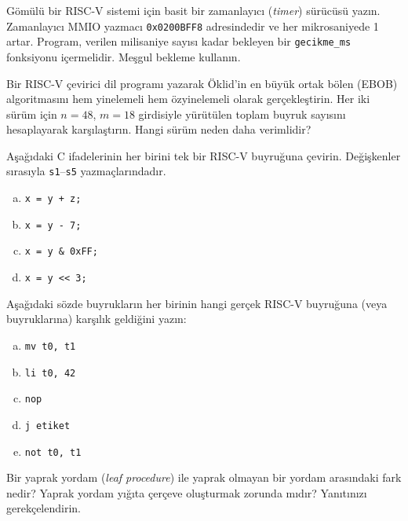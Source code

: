 \begin{alistirma}[\zor]
Gömülü bir RISC-V sistemi için basit bir zamanlayıcı (\emph{timer}) sürücüsü yazın. Zamanlayıcı MMIO yazmacı \texttt{0x0200BFF8} adresindedir ve her mikrosaniyede 1 artar. Program, verilen milisaniye sayısı kadar bekleyen bir \texttt{gecikme\_ms} fonksiyonu içermelidir. Meşgul bekleme kullanın.
\end{alistirma}

\begin{alistirma}[\zor]
Bir RISC-V çevirici dil programı yazarak Öklid'in en büyük ortak bölen (EBOB) algoritmasını hem yinelemeli hem özyinelemeli olarak gerçekleştirin. Her iki sürüm için $n = 48$, $m = 18$ girdisiyle yürütülen toplam buyruk sayısını hesaplayarak karşılaştırın. Hangi sürüm neden daha verimlidir?
\end{alistirma}


\begin{alistirma}[\kolay]
Aşağıdaki C ifadelerinin her birini tek bir RISC-V buyruğuna çevirin. Değişkenler sırasıyla \texttt{s1}--\texttt{s5} yazmaçlarındadır.
\begin{enumerate}[(a)]
\item \texttt{x = y + z;}
\item \texttt{x = y - 7;}
\item \texttt{x = y \& 0xFF;}
\item \texttt{x = y << 3;}
\end{enumerate}
\end{alistirma}

\begin{alistirma}[\kolay]
Aşağıdaki sözde buyrukların her birinin hangi gerçek RISC-V buyruğuna (veya buyruklarına) karşılık geldiğini yazın:
\begin{enumerate}[(a)]
\item \texttt{mv t0, t1}
\item \texttt{li t0, 42}
\item \texttt{nop}
\item \texttt{j etiket}
\item \texttt{not t0, t1}
\end{enumerate}
\end{alistirma}

\begin{alistirma}[\kolay]
Bir yaprak yordam (\emph{leaf procedure}) ile yaprak olmayan bir yordam arasındaki fark nedir? Yaprak yordam yığıta çerçeve oluşturmak zorunda mıdır? Yanıtınızı gerekçelendirin.
\end{alistirma}

